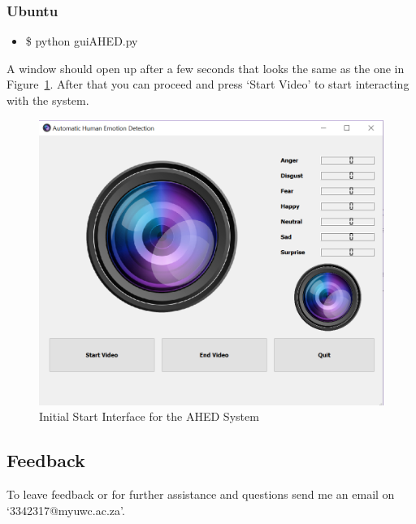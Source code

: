 \subsubsection{Ubuntu}
\begin{itemize}
\item \$ python guiAHED.py 
\end{itemize}
A window should open up after a few seconds that looks the same as the one in Figure~\ref{fig:start}. After that you can proceed and press `Start Video' to start interacting with the system.
\begin{figure}[H]
  \centering
  \includegraphics[scale=0.5]{start}
  \caption{Initial Start Interface for the AHED System}
  \label{fig:start}
\end{figure} 

\subsection{Feedback}
To leave feedback or for further assistance and questions send me an email on `3342317@myuwc.ac.za'.